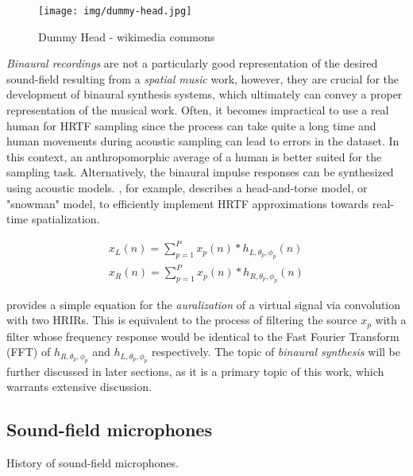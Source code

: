 \begin{figure}[ht!]%
\centering
\texttt{[image: img/dummy-head.jpg]} 
\label{fig:dummy-head}
\caption{Dummy Head - wikimedia commons}
\end{figure}

\textit{Binaural recordings} are not a particularly good representation of the desired sound-field resulting from a \textit{spatial music} work, however, they are crucial for the development of binaural synthesis systems, which ultimately can convey a proper representation of the musical work. Often, it becomes impractical to use a real human for HRTF sampling since the process can take quite a long time and human movements during acoustic sampling can lead to errors in the dataset. In this context, an anthropomorphic average of a human is better suited for the sampling task. Alternatively, the binaural impulse responses can be synthesized using acoustic models. \cite{algazi2002use}, for example, describes a head-and-torse model, or "snowman" model, to efficiently implement HRTF approximations towards real-time spatialization. 

\begin{equation} \label{eq:conv-hrir}
\begin{array}{l}
x_{L}(n)=\sum_{p=1}^{P} x_{p}(n) * h_{L, \theta_{p}, \phi_{p}}(n) \\
x_{R}(n)=\sum_{p=1}^{P} x_{p}(n) * h_{R, \theta_{p}, \phi_{p}}(n)
\end{array}
\end{equation}

\cite{hacihabiboglu2017perceptual} provides a simple equation for the \textit{auralization} of a virtual signal via convolution with two HRIRs. This is equivalent to the process of filtering the source $x_p$ with a filter whose frequency response would be identical to the Fast Fourier Transform (FFT) of $h_{R, \theta_{p}, \phi_{p}}$ and $h_{L, \theta_{p}, \phi_{p}}$ respectively. The topic of \textit{binaural synthesis} will be further discussed in later sections, as it is a primary topic of this work, which warrants extensive discussion.

\subsection{Sound-field microphones}

History of sound-field microphones.


